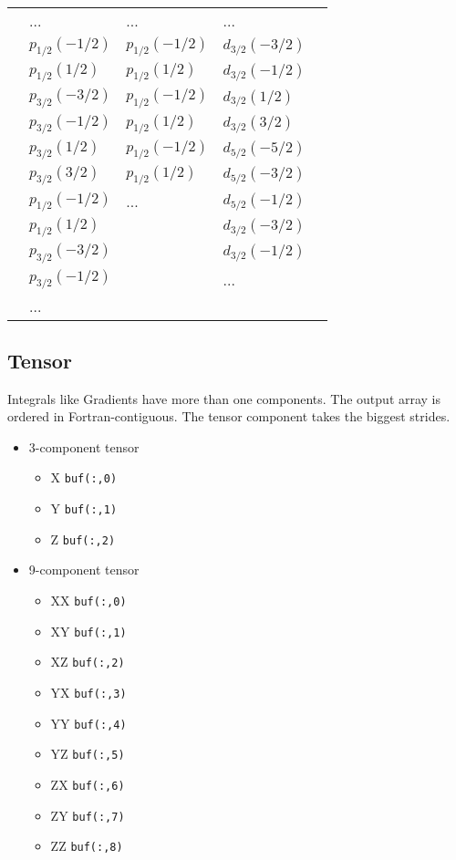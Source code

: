 \documentclass{article}
\begin{document}
\begin{itemize}
\begin{tabular}{l|l|l|l|l}
\hline
        & ...             & ...             & ...             &     \\
        & $p_{1/2}(-1/2)$ & $p_{1/2}(-1/2)$ & $d_{3/2}(-3/2)$ &     \\
        & $p_{1/2}( 1/2)$ & $p_{1/2}( 1/2)$ & $d_{3/2}(-1/2)$ &     \\
        & $p_{3/2}(-3/2)$ & $p_{1/2}(-1/2)$ & $d_{3/2}( 1/2)$ &     \\
        & $p_{3/2}(-1/2)$ & $p_{1/2}( 1/2)$ & $d_{3/2}( 3/2)$ &     \\
        & $p_{3/2}( 1/2)$ & $p_{1/2}(-1/2)$ & $d_{5/2}(-5/2)$ &     \\
        & $p_{3/2}( 3/2)$ & $p_{1/2}( 1/2)$ & $d_{5/2}(-3/2)$ &     \\
        & $p_{1/2}(-1/2)$ & ...             & $d_{5/2}(-1/2)$ &     \\
        & $p_{1/2}( 1/2)$ &                 & $d_{3/2}(-3/2)$ &     \\
        & $p_{3/2}(-3/2)$ &                 & $d_{3/2}(-1/2)$ &     \\
        & $p_{3/2}(-1/2)$ &                 & ...             &     \\
        & ...             &                 &                 &     \\
\hline
\end{tabular}
\end{itemize}
\subsection{Tensor}

Integrals like Gradients have more than one components. The output
array is ordered in Fortran-contiguous. The tensor component takes
the biggest strides.

\begin{itemize}
\item
  3-component tensor
  \begin{itemize}
  \item
    X \verb!buf(:,0)!
  \item
    Y \verb!buf(:,1)!
  \item
    Z \verb!buf(:,2)!
  \end{itemize}
\item
  9-component tensor
  \begin{itemize}
  \item
    XX \verb!buf(:,0)!
  \item
    XY \verb!buf(:,1)!
  \item
    XZ \verb!buf(:,2)!
  \item
    YX \verb!buf(:,3)!
  \item
    YY \verb!buf(:,4)!
  \item
    YZ \verb!buf(:,5)!
  \item
    ZX \verb!buf(:,6)!
  \item
    ZY \verb!buf(:,7)!
  \item
    ZZ \verb!buf(:,8)!
  \end{itemize}
\end{itemize}
\end{document}
